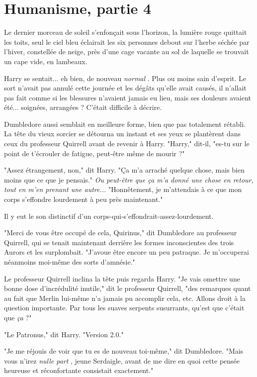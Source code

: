 
\chapter{Humanisme, partie 4}

Le dernier morceau de soleil s'enfonçait sous l'horizon, la lumière rouge quittait les toits, seul le ciel bleu éclairait les six personnes debout sur l'herbe séchée par l'hiver, constellée de neige, près d'une cage vacante au sol de laquelle se trouvait un cape vide, en lambeaux.

Harry se sentait... eh bien, de nouveau \emph{normal} . Plus ou moins sain d'esprit. Le sort n'avait pas annulé cette journée et les dégâts qu'elle avait causés, il n'allait pas fait comme si les blessures n'avaient jamais eu lieu, mais ses douleurs avaient été... soignées, arrangées ? C'était difficile à décrire.

Dumbledore aussi semblait en meilleure forme, bien que pas totalement rétabli. La tête du vieux sorcier se détourna un instant et ses yeux se plantèrent dans ceux du professeur Quirrell avant de revenir à Harry. "Harry," dit-il, "es-tu sur le point de t'écrouler de fatigue, peut-être même de mourir ?"

"Assez étrangement, non," dit Harry. "Ça m'a arraché quelque chose, mais bien moins que ce que je pensais." \emph{Ou peut-être que ça m'a donné une chose en retour, tout en m'en prenant une autre... } "Honnêtement, je m'attendais à ce que mon corps s'effondre lourdement à peu près maintenant."

Il y eut le son distinctif d'un corps-qui-s'effondrait-assez-lourdement.

"Merci de vous être occupé de cela, Quirinus," dit Dumbledore au professeur Quirrell, qui se tenait maintenant derrière les formes inconscientes des trois Aurors et les surplombait. "J'avoue être encore un peu patraque. Je m'occuperai néanmoins moi-même des sorts d'amnésie."

Le professeur Quirrell inclina la tête puis regarda Harry. "Je vais omettre une bonne dose d'incrédulité inutile," dit le professeur Quirrell, "des remarques quant au fait que Merlin lui-même n'a jamais pu accomplir cela, etc. Allons droit à la question importante. Par tous les suaves serpents susurrants, qu'est que c'était que \emph{ça}  ?"

"Le Patronus," dit Harry. "Version 2.0."

"Je me réjouis de voir que tu es de nouveau toi-même," dit Dumbledore. "Mais vous n'irez \emph{nulle part} , jeune Serdaigle, avant de me dire en quoi cette pensée heureuse et réconfortante consistait exactement."

